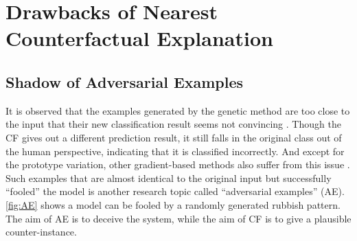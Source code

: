 \section{Drawbacks of Nearest Counterfactual Explanation}\label{sec:adversarial}

\subsection{Shadow of Adversarial Examples}
It is observed that the examples generated by the genetic method are too close to the input that their new classification result seems not convincing \cite{onePixel,certifai}. Though the CF gives out a different prediction result, it still falls in the original class out of the human perspective, indicating that it is classified incorrectly. And except for the prototype variation, other gradient-based methods also suffer from this issue \cite{prototype}. Such examples that are almost identical to the original input but successfully ``fooled'' the model is another research topic called ``adversarial examples'' (AE). \autoref{fig:AE} shows a model can be fooled by a randomly generated rubbish pattern. The aim of AE is to deceive the system, while the aim of CF is to give a plausible counter-instance.

